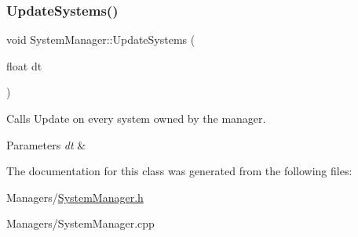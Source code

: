 \subsubsection{\texorpdfstring{Update\+Systems()}{UpdateSystems()}}
{\footnotesize\ttfamily void System\+Manager\+::\+Update\+Systems (\begin{DoxyParamCaption}\item[{float}]{dt }\end{DoxyParamCaption})}



Calls Update on every system owned by the manager. 


\begin{DoxyParams}{Parameters}
{\em dt} & \\
\hline
\end{DoxyParams}


The documentation for this class was generated from the following files\+:\begin{DoxyCompactItemize}
\item 
Managers/\hyperlink{SystemManager_8h}{System\+Manager.\+h}\item 
Managers/System\+Manager.\+cpp\end{DoxyCompactItemize}
